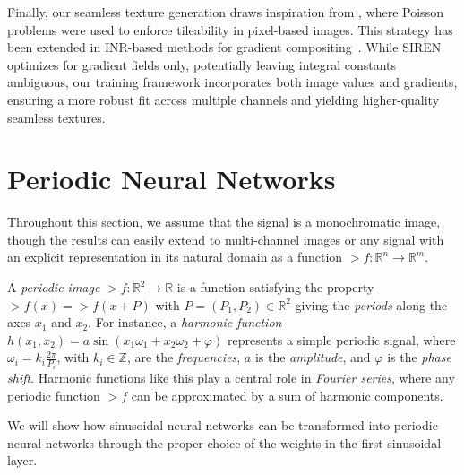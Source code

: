 
Finally, our seamless texture generation draws inspiration from \citet{perez2003}, where Poisson problems were used to enforce tileability in pixel-based images. This strategy has been extended in INR-based methods for gradient compositing~\citep{sitzmann2019siren, schardong2024neural}. While SIREN optimizes for gradient fields only, potentially leaving integral constants ambiguous, our training framework incorporates both image values and gradients, ensuring a more robust fit across multiple channels and yielding higher-quality seamless textures.


\section{Periodic Neural Networks}

Throughout this section, we assume that the signal is a monochromatic image, though the results can easily extend to multi-channel images or any signal with an explicit representation in its natural domain as a function \( \gt{f}: \mathbb{R}^n \to \mathbb{R}^m \).

A \textit{periodic image} $\gt{f}:\mathbb{R}^2\to \mathbb{R}$ is a function satisfying the property $\gt{f}(x) \!=\! \gt{f}(x + P)$ with $P=(P_1, P_2)\in \mathbb{R}^2$ giving the \textit{periods} along the axes $x_1$ and $x_2$.
For instance, a \textit{harmonic function} $h(x_1, x_2)=a\sin(x_1\omega_1+x_2\omega_2+ \varphi)$ represents a simple periodic signal, where $\omega_i\!=\!k_i\frac{2\pi}{P_i}$, with \( k_i \in \mathbb{Z} \), are the \textit{frequencies}, $a$ is the \textit{amplitude}, and $\varphi$ is the \textit{phase shift}.
Harmonic functions like this play a central role in \textit{Fourier series}, where any periodic function $\gt{f}$ can be approximated by a sum of harmonic components.

We will show how sinusoidal neural networks can be transformed into periodic neural networks through the proper choice of the weights in the first sinusoidal layer.

